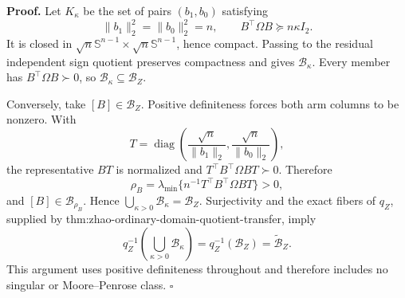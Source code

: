 \textbf{Proof.}
Let \(K_\kappa\) be the set of pairs \((b_1,b_0)\) satisfying
\[
 \lVert b_1\rVert_2^2=\lVert b_0\rVert_2^2=n,
 \qquad B^{\top}\Omega B\succeq n\kappa I_2.
\]
It is closed in \(\sqrt n\mathbb S^{n-1}\times\sqrt n\mathbb S^{n-1}\), hence compact.  Passing to the residual independent sign quotient preserves compactness and gives \(\mathcal B_\kappa\).  Every member has \(B^{\top}\Omega B\succ0\), so \(\mathcal B_\kappa\subseteq\mathcal B_Z\).

Conversely, take \([B]\in\mathcal B_Z\).  Positive definiteness forces both arm columns to be nonzero.  With
\[
 T=\operatorname{diag}\!\left(\frac{\sqrt n}{\lVert b_1\rVert_2},
 \frac{\sqrt n}{\lVert b_0\rVert_2}\right),
\]
the representative \(BT\) is normalized and \(T^{\top}B^{\top}\Omega BT\succ0\).  Therefore
\[
 \rho_B=\lambda_{\min}\{n^{-1}T^{\top}B^{\top}\Omega BT\}>0,
\]
and \([B]\in\mathcal B_{\rho_B}\).  Hence \(\bigcup_{\kappa>0}\mathcal B_\kappa=\mathcal B_Z\).  Surjectivity and the exact fibers of \(q_Z\), supplied by thm:zhao-ordinary-domain-quotient-transfer, imply
\[
q_Z^{-1}\!\left(\bigcup_{\kappa>0}\mathcal B_\kappa\right)
=q_Z^{-1}(\mathcal B_Z)=\widetilde{\mathcal B}_Z.
\]
This argument uses positive definiteness throughout and therefore includes no singular or Moore--Penrose class. \(\square\)